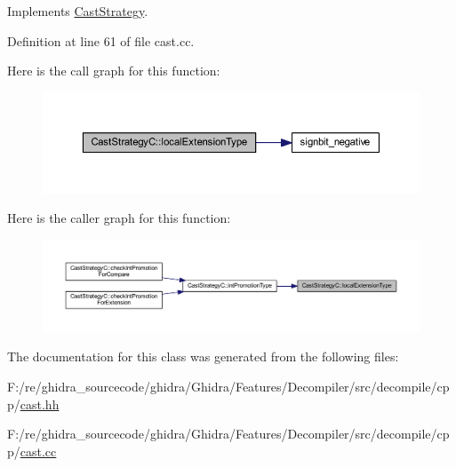 Implements \mbox{\hyperlink{class_cast_strategy_af9c6535f6d9337185887dba89ccb9de3}{Cast\+Strategy}}.



Definition at line 61 of file cast.\+cc.

Here is the call graph for this function\+:
\nopagebreak
\begin{figure}[H]
\begin{center}
\leavevmode
\includegraphics[width=350pt]{class_cast_strategy_c_ac630d23883fc4d95a12eba08b64e6734_cgraph}
\end{center}
\end{figure}
Here is the caller graph for this function\+:
\nopagebreak
\begin{figure}[H]
\begin{center}
\leavevmode
\includegraphics[width=350pt]{class_cast_strategy_c_ac630d23883fc4d95a12eba08b64e6734_icgraph}
\end{center}
\end{figure}


The documentation for this class was generated from the following files\+:\begin{DoxyCompactItemize}
\item 
F\+:/re/ghidra\+\_\+sourcecode/ghidra/\+Ghidra/\+Features/\+Decompiler/src/decompile/cpp/\mbox{\hyperlink{cast_8hh}{cast.\+hh}}\item 
F\+:/re/ghidra\+\_\+sourcecode/ghidra/\+Ghidra/\+Features/\+Decompiler/src/decompile/cpp/\mbox{\hyperlink{cast_8cc}{cast.\+cc}}\end{DoxyCompactItemize}
